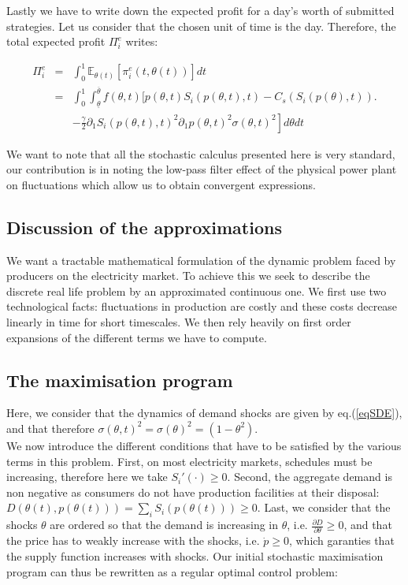 Lastly we have to write down the expected profit for a day's worth of submitted strategies. Let us consider that the chosen unit of time is the day. Therefore, the total expected profit $\Pi^e_i$ writes: 

\begin{eqnarray}
\Pi^e_i&=&\int_0^1\mathbb{E}_{\theta(t)}[\pi^e_i(t,\theta(t))]dt\nonumber\\
&=&\int_0^1\int_{\underline{\theta}}^{\overline{\theta}}f(\theta,t)\Big[p(\theta,t)S_i(p(\theta,t),t) - C_s(S_i(p(\theta),t)) \Big.\nonumber\\
&&\left.-\frac{\gamma}{2} \partial_1S_i(p(\theta,t),t)^2\partial_1p(\theta,t)^2 \sigma(\theta,t)^2\right]d\theta dt
\label{totprofit}
\end{eqnarray}

We want to note that all the stochastic calculus presented here is very standard, our contribution is in noting the low-pass filter effect of the physical power plant on fluctuations which allow us to obtain convergent expressions.

\subsection{Discussion of the approximations}
We want a tractable mathematical formulation of the dynamic problem faced by producers on the electricity market. To achieve this we seek to describe the discrete real life problem by an approximated continuous one. We first use two technological facts: fluctuations in production are costly and these costs decrease linearly in time for short timescales. We then rely heavily on first order expansions of the different terms we have to compute.  

\subsection{The maximisation program}
Here, we consider that the dynamics of demand shocks are given by eq.(\ref{eqSDE}), and that therefore  $\sigma(\theta,t)^2=\sigma(\theta)^2=(1-\theta^2)$.\\

We now introduce the different conditions that have to be satisfied by the various terms in this problem. First, on most electricity markets, schedules must be increasing, therefore here we take $S_i'(\cdot)\geq0$. Second, the aggregate demand is non negative as consumers do not have production facilities at their disposal: $D(\theta(t),p(\theta(t)))=\sum_iS_i(p(\theta(t)))\geq0$. Last, we consider that the shocks $\theta$ are ordered so that the demand is increasing in $\theta$, i.e. $\frac{\partial D}{\partial\theta}\geq0$, and that the price has to weakly increase with the shocks, i.e. $\dot{p}\geq0$, which garanties that the supply function increases with shocks. Our initial stochastic maximisation program can thus be rewritten as a regular optimal control problem: 


